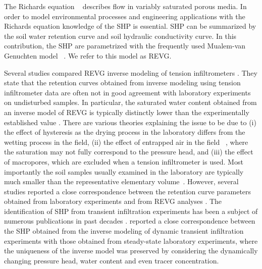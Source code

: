 \documentclass[review,times,3p,twocolumn,10pt]{elsarticle}
\begin{document}
The Richards equation ~\citep{richards} describes flow in variably saturated porous media. In order to model environmental processes and engineering applications with the Richards equation knowledge of the SHP is essential. SHP can be summarized by the soil water retention curve and soil hydraulic conductivity curve. In this contribution, the SHP are parametrized with the frequently used Mualem-van Genuchten model ~\citep{vangenuchten}. We refer to this model as REVG.







Several studies compared REVG inverse modeling of tension infiltrometers \citep{Simunek1,Simunek2, Schwartz,Ventrella,Ramos, Verbist,rezaei}. They state that the retention curves obtained from inverse modeling using tension infiltrometer data are often not in good agreement with laboratory experiments on undisturbed samples. In particular, the saturated water content obtained from an inverse model of REVG is typically distinctly lower than the experimentally established value \citep{Simunek1, Verbist}. 
There are various theories explaining the issue to be due to (i) the effect of hysteresis as the drying process in the laboratory differs from the wetting process in the field, (ii) the effect of entrapped air in the field ~\citep{Fodor}, where the saturation may not fully correspond to the pressure head, and (iii) the effect of macropores, which are excluded when a tension infiltrometer is used.  Most importantly the soil samples usually examined in the laboratory are typically much smaller than the representative elementary volume~\citep{scharnagl}.
However, several studies  reported a close correspondence between the retention curve parameters obtained from laboratory experiments and from REVG analyses \citep{Ramos, Schwartz}. 
The identification of SHP from transient infiltration experiments has been a subject of numerous publications in past decades \citep{simunek-infiltr2shp, infiltr2shp, simunek2-infiltr2shp, XU201234, BAGARELLO201770,  hess-Younes-2017}.  \cite{simunek-infiltr2shp} reported a close correspondence between the SHP obtained from the inverse modeling of dynamic transient infiltration experiments with those obtained from steady-state laboratory experiments, where the uniqueness of the inverse model was preserved by considering the dynamically changing pressure head, water content and even tracer concentration.
\end{document}
